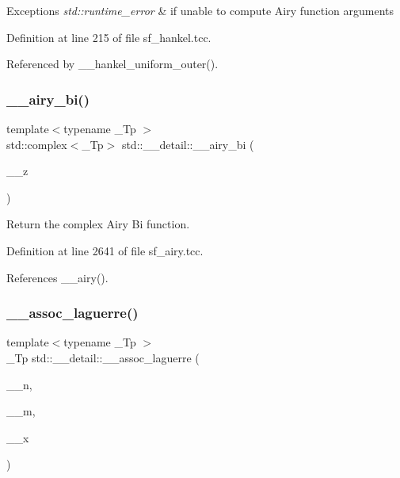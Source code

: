 \begin{DoxyExceptions}{Exceptions}
{\em std\+::runtime\+\_\+error} & if unable to compute Airy function arguments \\
\hline
\end{DoxyExceptions}


Definition at line 215 of file sf\+\_\+hankel.\+tcc.



Referenced by \+\_\+\+\_\+hankel\+\_\+uniform\+\_\+outer().

\mbox{\label{namespacestd_1_1____detail_ae5536305d721e393efe1a74f0e57653e}} 
\subsubsection{\texorpdfstring{\+\_\+\+\_\+airy\+\_\+bi()}{\_\_airy\_bi()}}
{\footnotesize\ttfamily template$<$typename \+\_\+\+Tp $>$ \\
std\+::complex$<$\+\_\+\+Tp$>$ std\+::\+\_\+\+\_\+detail\+::\+\_\+\+\_\+airy\+\_\+bi (\begin{DoxyParamCaption}\item[{std\+::complex$<$ \+\_\+\+Tp $>$}]{\+\_\+\+\_\+z }\end{DoxyParamCaption})}



Return the complex Airy Bi function. 



Definition at line 2641 of file sf\+\_\+airy.\+tcc.



References \+\_\+\+\_\+airy().

\mbox{\label{namespacestd_1_1____detail_a7d47c4512f7c6914f5504fde6ffa31fb}} 
\subsubsection{\texorpdfstring{\+\_\+\+\_\+assoc\+\_\+laguerre()}{\_\_assoc\_laguerre()}}
{\footnotesize\ttfamily template$<$typename \+\_\+\+Tp $>$ \\
\+\_\+\+Tp std\+::\+\_\+\+\_\+detail\+::\+\_\+\+\_\+assoc\+\_\+laguerre (\begin{DoxyParamCaption}\item[{unsigned int}]{\+\_\+\+\_\+n,  }\item[{unsigned int}]{\+\_\+\+\_\+m,  }\item[{\+\_\+\+Tp}]{\+\_\+\+\_\+x }\end{DoxyParamCaption})}



